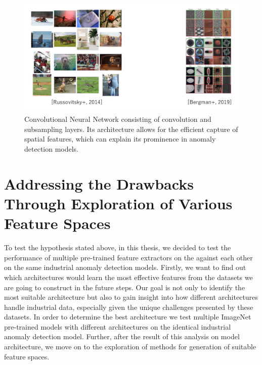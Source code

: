 \begin{figure}[h]
	\begin{center}
		\includegraphics[width=1.0\linewidth]{Chapter_3/discrepancy.png}
	\end{center}
	\caption{Convolutional Neural Network consisting of convolution and subsampling layers. Its architecture allows for the efficient capture of spatial features, which can explain its prominence in anomaly detection models.}
	\label{fig:cnn}
\end{figure} 	

\section{Addressing the Drawbacks Through Exploration of Various Feature Spaces}
\label{addressing the drawbacks}
To test the hypothesis stated above, in this thesis, we decided to test the performance of multiple pre-trained feature extractors on the against each other on the same industrial anomaly detection models. Firstly, we want to find out which architectures would learn the most effective features from the datasets we are going to construct in the future steps. Our goal is not only to identify the most suitable architecture but also to gain insight into how different architectures handle industrial data, especially given the unique challenges presented by these datasets. In order to determine the best architecture we test multiple ImageNet pre-trained models with different architectures on the identical industrial anomaly detection model. Further, after the result of this analysis on model architecture, we move on to the exploration of methods for generation of suitable feature spaces.

